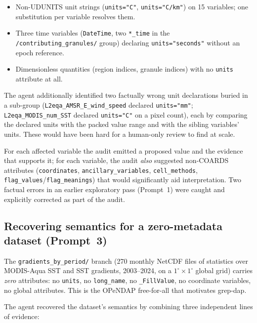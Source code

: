 \documentclass[11pt]{article}
\begin{document}
\begin{itemize}[topsep=2pt]
  \item Non-UDUNITS unit strings (\texttt{units="C"},
    \texttt{units="C/km"}) on 15 variables; one substitution per
    variable resolves them.
  \item Three time variables (\texttt{DateTime}, two
    \texttt{*\_time} in the \texttt{/contributing\_granules/}
    group) declaring \texttt{units="seconds"} without an epoch
    reference.
  \item Dimensionless quantities (region indices, granule indices)
    with no \texttt{units} attribute at all.
\end{itemize}

The agent additionally identified two factually wrong unit
declarations buried in a sub-group (\texttt{L2eqa\_AMSR\_E\_wind\_speed}
declared \texttt{units="mm"}; \texttt{L2eqa\_MODIS\_num\_SST}
declared \texttt{units="C"} on a pixel count), each by comparing
the declared units with the packed value range and with the
sibling variables' units. These would have been hard for a
human-only review to find at scale.

For each affected variable the audit emitted a proposed value
and the evidence that supports it; for each variable, the audit
\emph{also} suggested non-COARDS attributes (\texttt{coordinates},
\texttt{ancillary\_variables}, \texttt{cell\_methods},
\texttt{flag\_values}/\texttt{flag\_meanings}) that would
significantly aid interpretation. Two factual errors in an
earlier exploratory pass (Prompt~1) were caught and explicitly
corrected as part of the audit.

\subsection{Recovering semantics for a zero-metadata dataset (Prompt~3)}

The \texttt{gradients\_by\_period/} branch (270 monthly NetCDF
files of statistics over MODIS-Aqua SST and SST gradients,
2003--2024, on a $1^\circ \times 1^\circ$ global grid) carries
\emph{zero} attributes: no \texttt{units}, no
\texttt{long\_name}, no \texttt{\_FillValue}, no coordinate
variables, no global attributes. This is the OPeNDAP free-for-all
that motivates grep-dap.

The agent recovered the dataset's semantics by combining three
independent lines of evidence:
\end{document}
